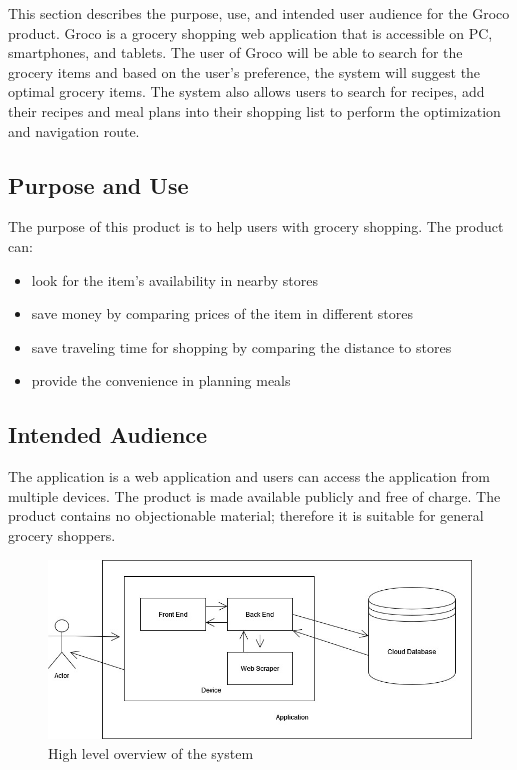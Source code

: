 This section describes the purpose, use, and intended user audience for the Groco product. Groco is a grocery shopping web application that is accessible on PC, smartphones, and tablets. The user of Groco will be able to search for the grocery items and based on the user's preference, the system will suggest the optimal grocery items. The system also allows users to search for recipes, add their recipes and meal plans into their shopping list to perform the optimization and navigation route.

\subsection{Purpose and Use}
The purpose of this product is to help users with grocery shopping. The product can:
\begin{itemize}
    \item look for the item's availability in nearby stores
    \item save money by comparing prices of the item in different stores
    \item save traveling time for shopping by comparing the distance to stores
    \item provide the convenience in planning meals
\end{itemize} 

\subsection{Intended Audience}
The application is a web application and users can access the application from multiple devices. The product is made available publicly and free of charge. The product contains no objectionable material; therefore it is suitable for general grocery shoppers.

\begin{figure}[h!]
	\centering
   	\includegraphics[width=1\textwidth]{images/system_diagram.jpg}
    \caption{High level overview of the system}
\end{figure}
